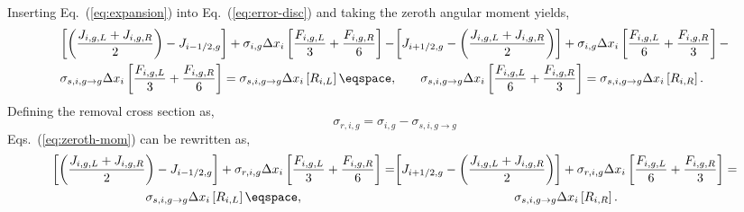 \noindent
	\indent Inserting Eq.~(\ref{eq:expansion}) into Eq.~(\ref{eq:error-disc}) and taking
	the zeroth angular moment yields, 
\begin{subequations}
	\begin{multline}
		\left[\left(\frac{{J_{i,g,L}}+{J_{i,g,R}}}{2}\right)-{J_{i-1/2,g}}\right]
		+{\sigma}_{i,g}{\Delta{x}_{i}}\left[{\frac{{F_{i,g,L}}}{3}}+
		{\frac{{F_{i,g,R}}}{6}}\right] - \\
		{\sigma}_{s,i,g\rightarrow{g}}{\Delta{x}_{i}}
		\left[{\frac{{F_{i,g,L}}}{3}}+{\frac{{F_{i,g,R}}}{6}}\right] = 
		{\sigma}_{s,i,g\rightarrow{g}}{\Delta{x}_{i}}
		\left[R_{i,L}\right]
		\eqspace,
	\end{multline}
	\begin{multline}
		\left[{J_{i+1/2,g}}-\left(\frac{{J_{i,g,L}}+{J_{i,g,R}}}{2}\right)\right]
		+{\sigma}_{i,g}{\Delta{x}_{i}}\left[{\frac{{F_{i,g,L}}}{6}}+
		{\frac{{F_{i,g,R}}}{3}}\right] - \\
		{\sigma}_{s,i,g\rightarrow{g}}{\Delta{x}_{i}}
		\left[{\frac{{F_{i,g,L}}}{6}}+{\frac{{F_{i,g,R}}}{3}}\right] = 
		{\sigma}_{s,i,g\rightarrow{g}}{\Delta{x}_{i}}
		\left[R_{i,R}\right].
	\end{multline}
	\label{eq:zeroth-mom}
\end{subequations}
	Defining the removal cross section as,
\begin{equation}
	\sigma_{r,i,g} = \sigma_{i,g} - \sigma_{s,i,g\rightarrow{g}}
\end{equation}
	Eqs.~(\ref{eq:zeroth-mom}) can be rewritten as, 
\begin{subequations}
	\begin{multline}
		\left[\left(\frac{{J_{i,g,L}}+{J_{i,g,R}}}{2}\right)-{J_{i-1/2,g}}\right]
		+{\sigma}_{r,i,g}{\Delta{x}_{i}}\left[{\frac{{F_{i,g,L}}}{3}}+
		{\frac{{F_{i,g,R}}}{6}}\right] = \\ 
		{\sigma}_{s,i,g\rightarrow{g}}{\Delta{x}_{i}}
		\left[R_{i,L}\right]
		\eqspace,
		\label{eq:zeroth-mom2a}
	\end{multline}
	\begin{multline}
		\left[{J_{i+1/2,g}}-\left(\frac{{J_{i,g,L}}+{J_{i,g,R}}}{2}\right)\right]
		+{\sigma}_{r,i,g}{\Delta{x}_{i}}\left[{\frac{{F_{i,g,L}}}{6}}+
		{\frac{{F_{i,g,R}}}{3}}\right] = \\ 
		{\sigma}_{s,i,g\rightarrow{g}}{\Delta{x}_{i}}
		\left[R_{i,R}\right].
		\label{eq:zeroth-mom2b}
	\end{multline}
	\label{eq:zeroth-mom2}
\end{subequations}
